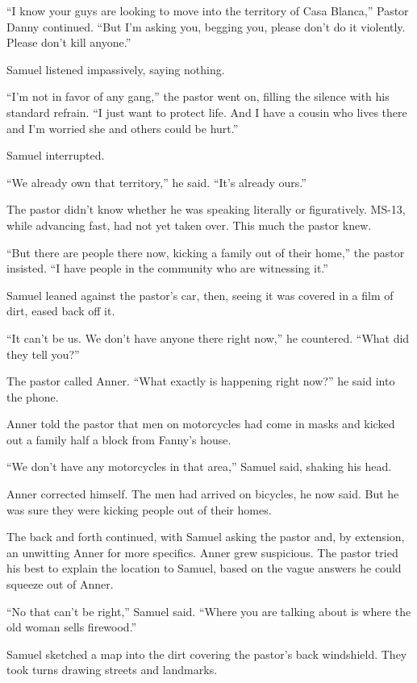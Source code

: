 ``I know your guys are looking to move into the territory of Casa
Blanca,'' Pastor Danny continued. ``But I'm asking you, begging you,
please don't do it violently. Please don't kill anyone.''

Samuel listened impassively, saying nothing.

``I'm not in favor of any gang,'' the pastor went on, filling the
silence with his standard refrain. ``I just want to protect life. And I
have a cousin who lives there and I'm worried she and others could be
hurt.''

Samuel interrupted.

``We already own that territory,'' he said. ``It's already ours.''

The pastor didn't know whether he was speaking literally or
figuratively. MS-13, while advancing fast, had not yet taken over. This
much the pastor knew.

``But there are people there now, kicking a family out of their home,''
the pastor insisted. ``I have people in the community who are witnessing
it.''

Samuel leaned against the pastor's car, then, seeing it was covered in a
film of dirt, eased back off it.

``It can't be us. We don't have anyone there right now,'' he countered.
``What did they tell you?''

The pastor called Anner. ``What exactly is happening right now?'' he
said into the phone.

Anner told the pastor that men on motorcycles had come in masks and
kicked out a family half a block from Fanny's house.

``We don't have any motorcycles in that area,'' Samuel said, shaking his
head.

Anner corrected himself. The men had arrived on bicycles, he now said.
But he was sure they were kicking people out of their homes.

The back and forth continued, with Samuel asking the pastor and, by
extension, an unwitting Anner for more specifics. Anner grew suspicious.
The pastor tried his best to explain the location to Samuel, based on
the vague answers he could squeeze out of Anner.

``No that can't be right,'' Samuel said. ``Where you are talking about
is where the old woman sells firewood.''

Samuel sketched a map into the dirt covering the pastor's back
windshield. They took turns drawing streets and landmarks.

